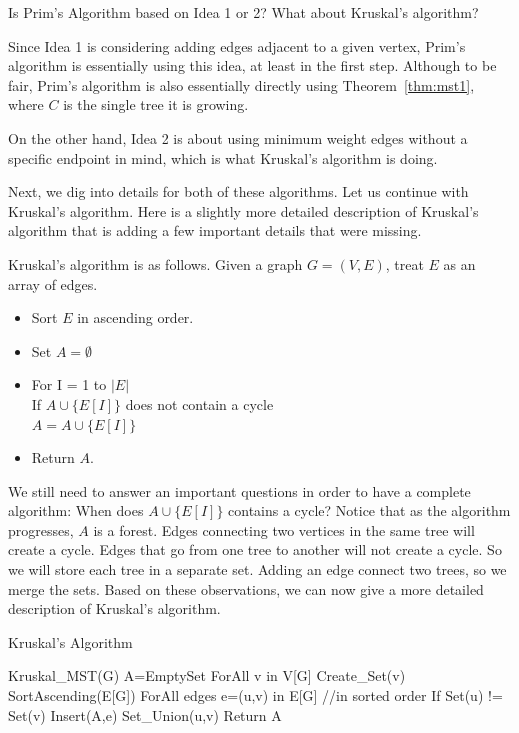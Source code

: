 \begin{ques}
Is Prim's Algorithm based on Idea 1 or 2? What about 
Kruskal's algorithm?
\vspace*{1in}
\begin{answer}
Since Idea 1 is considering adding edges adjacent to a given vertex,
Prim's algorithm is essentially using this idea, at least in the first step.
Although to be fair, Prim's algorithm is also essentially directly using
Theorem~\ref{thm:mst1}, where $C$ is the single tree it is growing.

On the other hand, Idea 2 is about using minimum weight edges 
without a specific endpoint in mind, which is what Kruskal's 
algorithm is doing.
\end{answer}
\end{ques}
Next, we dig into details for both of these algorithms. Let us
continue with Kruskal's algorithm.
Here is a slightly more detailed description of Kruskal's algorithm
that is adding a few important details that were missing. 
\begin{exa}
Kruskal's algorithm is as follows.
Given a graph $G=(V,E)$, treat $E$ as an array of edges.
\begin{itemize}
\item
Sort $E$ in ascending order.
\item
Set $A=\emptyset$
\item
For I = 1 to $|E|$\\
\hspace*{.1in} If $A\cup\{E[I]\}$ does not contain a cycle\\
\hspace*{.2in} $A=A\cup\{E[I]\}$
\item
Return $A$.
\end{itemize}
\end{exa}

We still need to answer an important questions in order to 
have a complete algorithm: 
When does $A\cup\{E[I]\}$ contains a cycle?
Notice that 
as the algorithm progresses, $A$ is a forest. 
Edges connecting two vertices in the same tree
will create a cycle.
Edges that go from one tree to another will not create a cycle.
So we will store each tree in a separate set.
Adding an edge connect two trees, so we merge the sets.
Based on these observations, we 
can now give a more detailed description of Kruskal's algorithm.

\begin{proc}
Kruskal's Algorithm

\begin{code}
Kruskal_MST(G)
   A=EmptySet
   ForAll v in V[G]
       Create_Set(v)
   SortAscending(E[G])
   ForAll edges e=(u,v) in E[G] //in sorted order
       If Set(u) != Set(v) 
          Insert(A,e)
          Set_Union(u,v)
   Return A
\end{code}
\end{proc}

